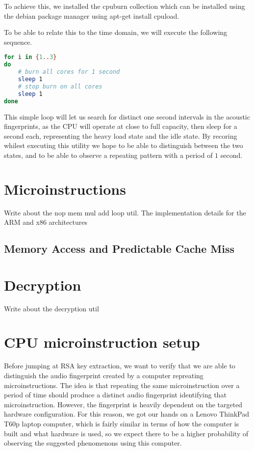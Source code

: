 To achieve this, we installed the cpuburn collection which can be installed using the debian package manager using
apt-get install cpuload. 

To be able to relate this to the time domain, we will execute the following sequence.

\begin{lstlisting}[language=BASH, caption={CPU Burn Utility}]
for i in {1..3}
do
	# burn all cores for 1 second
	sleep 1
	# stop burn on all cores
	sleep 1
done
\end{lstlisting}

This simple loop will let us search for distinct one second intervals in the acoustic fingerprints, as the CPU will operate at close to full capacity, then sleep for a second each, representing the heavy load state and the idle state.
By recoring whilest executing this utility we hope to be able to distinguish between the two states, and to be able to observe a repeating pattern with a period of \(1\) second.

\section{Microinstructions}
Write about the nop mem mul add loop util.
The implementation details for the ARM and x86 architectures

\subsection{Memory Access and Predictable Cache Miss}

\section{Decryption}
Write about the decryption util

\section{CPU microinstruction setup}\label{sec:ch4_cpu_microinstruction_setup}
Before jumping at RSA key extraction, we want to verify that we are able to distinguish the audio fingerprint created by a computer repreating microinstructions. 
The idea is that repeating the same microinstruction over a period of time should produce a distinct audio fingerprint identifying that microinstruction. 
However, the fingerprint is heavily dependent on the targeted hardware configuration. 
For this reason, we got our hands on a Lenovo ThinkPad T60p laptop computer, which is fairly similar in terms of how the computer is built and what hardware is used, so we expect there to be a higher probability of observing the suggested phenomenons using this computer.

